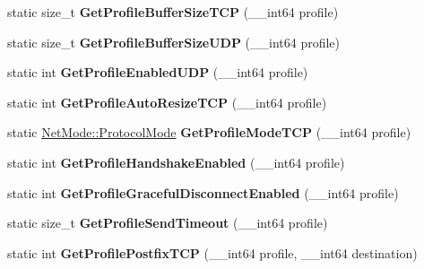 \begin{DoxyCompactItemize}
\item 
\hypertarget{structmn_c_l_r_afde534954e3ffb516492ecd3844e2716}{
static size\_\-t {\bfseries GetProfileBufferSizeTCP} (\_\-\_\-int64 profile)}
\label{structmn_c_l_r_afde534954e3ffb516492ecd3844e2716}

\item 
\hypertarget{structmn_c_l_r_ac153c242e6cf46d72193ec53831a090e}{
static size\_\-t {\bfseries GetProfileBufferSizeUDP} (\_\-\_\-int64 profile)}
\label{structmn_c_l_r_ac153c242e6cf46d72193ec53831a090e}

\item 
\hypertarget{structmn_c_l_r_a103118870f5532e96336de00aa7e12d6}{
static int {\bfseries GetProfileEnabledUDP} (\_\-\_\-int64 profile)}
\label{structmn_c_l_r_a103118870f5532e96336de00aa7e12d6}

\item 
\hypertarget{structmn_c_l_r_a77739afeb7b1f5b716df4099d5d4af83}{
static int {\bfseries GetProfileAutoResizeTCP} (\_\-\_\-int64 profile)}
\label{structmn_c_l_r_a77739afeb7b1f5b716df4099d5d4af83}

\item 
\hypertarget{structmn_c_l_r_a61526ed9c044cb6c0203807ac763d997}{
static \hyperlink{class_net_mode_a43cfa55ee6a4db66a8d7d6c27f766964}{NetMode::ProtocolMode} {\bfseries GetProfileModeTCP} (\_\-\_\-int64 profile)}
\label{structmn_c_l_r_a61526ed9c044cb6c0203807ac763d997}

\item 
\hypertarget{structmn_c_l_r_aa7988d0f2cc6fe7eef5321ca3493bdd8}{
static int {\bfseries GetProfileHandshakeEnabled} (\_\-\_\-int64 profile)}
\label{structmn_c_l_r_aa7988d0f2cc6fe7eef5321ca3493bdd8}

\item 
\hypertarget{structmn_c_l_r_a3b67bf17c146f0f0552fd9da90ff1680}{
static int {\bfseries GetProfileGracefulDisconnectEnabled} (\_\-\_\-int64 profile)}
\label{structmn_c_l_r_a3b67bf17c146f0f0552fd9da90ff1680}

\item 
\hypertarget{structmn_c_l_r_a21135a71e75b0d57896e1abd74ce4d03}{
static size\_\-t {\bfseries GetProfileSendTimeout} (\_\-\_\-int64 profile)}
\label{structmn_c_l_r_a21135a71e75b0d57896e1abd74ce4d03}

\item 
\hypertarget{structmn_c_l_r_ab5f474b4e51b1947db6b0f0521261c93}{
static int {\bfseries GetProfilePostfixTCP} (\_\-\_\-int64 profile, \_\-\_\-int64 destination)}
\label{structmn_c_l_r_ab5f474b4e51b1947db6b0f0521261c93}


\end{DoxyCompactItemize}
